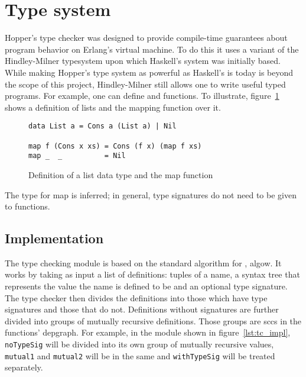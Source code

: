 \section{Type system}
\label{sec:dai_tc}

Hopper's type checker was designed to provide compile-time guarantees about program behavior on Erlang's virtual machine. To do this it uses a variant of the Hindley-Milner\cite{TypeSchemes} \gls{typesystem} upon which Haskell's system was initially based. While making Hopper's type system as powerful as Haskell's is today is beyond the scope of this project, Hindley-Milner still allows one to write useful typed programs. For example, one can define  and functions. To illustrate, figure~\ref{lst:tc_map} shows a definition of lists and the mapping function over it. 

\begin{figure}[!htb]
\centering
\begin{minipage}[b]{0.68\linewidth}
\centering
\begin{lstlisting}
data List a = Cons a (List a) | Nil

map f (Cons x xs) = Cons (f x) (map f xs)
map _  _          = Nil
\end{lstlisting}
\end{minipage}
\caption{Definition of a list data type and the map function}
\label{lst:tc_map}
\end{figure}

The type for map is inferred; in general, type signatures do not need to be given to functions.

\subsection{Implementation}

The type checking module is based on the standard algorithm for , \Gls{algow}. It works by taking as input a list of definitions: tuples of a name, a syntax tree that represents the value the name is defined to be and an optional type signature. The type checker then divides the definitions into those which have type signatures and those that do not. Definitions without signatures are further divided into groups of mutually recursive definitions. Those groups are \glspl{scc} in the functions' \gls{depgraph}. For example, in the module shown in figure~\ref{lst:tc_impl}, \texttt{noTypeSig} will be divided into its own group of mutually recursive values, \texttt{mutual1} and \texttt{mutual2} will be in the same and \texttt{withTypeSig} will be treated separately. 

